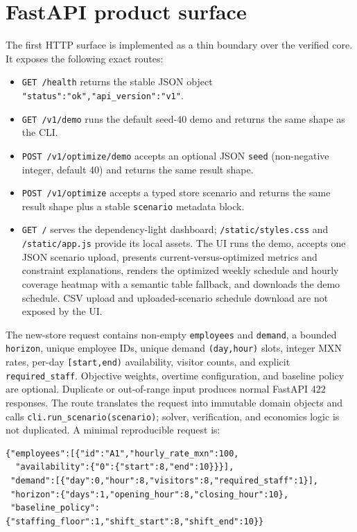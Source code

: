 \documentclass[11pt,a4paper]{article}
\begin{document}
\section{FastAPI product surface}
The first HTTP surface is implemented as a thin boundary over the verified core. It exposes the following exact routes:
\begin{itemize}
  \item \texttt{GET /health} returns the stable JSON object \texttt{"status":"ok","api\_version":"v1"}.
  \item \texttt{GET /v1/demo} runs the default seed-40 demo and returns the same shape as the CLI.
  \item \texttt{POST /v1/optimize/demo} accepts an optional JSON \texttt{seed} (non-negative integer, default 40) and returns the same result shape.
  \item \texttt{POST /v1/optimize} accepts a typed store scenario and returns the same result shape plus a stable \texttt{scenario} metadata block.
  \item \texttt{GET /} serves the dependency-light dashboard; \texttt{/static/styles.css} and \texttt{/static/app.js} provide its local assets. The UI runs the demo, accepts one JSON scenario upload, presents current-versus-optimized metrics and constraint explanations, renders the optimized weekly schedule and hourly coverage heatmap with a semantic table fallback, and downloads the demo schedule. CSV upload and uploaded-scenario schedule download are not exposed by the UI.
\end{itemize}
The new-store request contains non-empty \texttt{employees} and \texttt{demand}, a bounded \texttt{horizon}, unique employee IDs, unique demand \texttt{(day,hour)} slots, integer MXN rates, per-day \texttt{[start,end)} availability, visitor counts, and explicit \texttt{required\_staff}. Objective weights, overtime configuration, and baseline policy are optional. Duplicate or out-of-range input produces normal FastAPI 422 responses. The route translates the request into immutable domain objects and calls \texttt{cli.run\_scenario(scenario)}; solver, verification, and economics logic is not duplicated. A minimal reproducible request is:

\begin{verbatim}
{"employees":[{"id":"A1","hourly_rate_mxn":100,
  "availability":{"0":{"start":8,"end":10}}}],
 "demand":[{"day":0,"hour":8,"visitors":8,"required_staff":1}],
 "horizon":{"days":1,"opening_hour":8,"closing_hour":10},
 "baseline_policy":{"staffing_floor":1,"shift_start":8,"shift_end":10}}
\end{verbatim}
\end{document}
